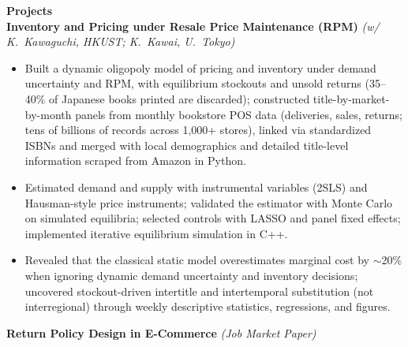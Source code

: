 \documentclass[11pt,letterpaper]{article}
\begin{document}
\vspace{0.15pt}

{\large \textbf{Projects}}\\[-0.5pt]
\textbf{Inventory and Pricing under Resale Price Maintenance (RPM)} \textit{(w/ K.\ Kawaguchi, HKUST; K.\ Kawai, U.\ Tokyo)}\\
\vspace{-6pt}
\begin{itemize}
  \item Built a dynamic oligopoly model of pricing and inventory under demand uncertainty and RPM, with equilibrium stockouts and unsold returns (35--40\% of Japanese books printed are discarded); constructed title-by-market-by-month panels from monthly bookstore POS data (deliveries, sales, returns; tens of billions of records across 1{,}000+ stores), linked via standardized ISBNs and merged with local demographics and detailed title-level information scraped from Amazon in Python.
  \item Estimated demand and supply with instrumental variables (2SLS) and Hausman-style price instruments; validated the estimator with Monte Carlo on simulated equilibria; selected controls with LASSO and panel fixed effects; implemented iterative equilibrium simulation in C++.
  \item Revealed that the classical static model overestimates marginal cost by \(\sim\)20\% when ignoring dynamic demand uncertainty and inventory decisions; uncovered stockout-driven intertitle and intertemporal substitution (not interregional) through weekly descriptive statistics, regressions, and figures.
\end{itemize}
\vspace{-3pt}
\textbf{Return Policy Design in E-Commerce} \textit{(Job Market Paper)}\\
\vspace{-6pt}
\end{document}
